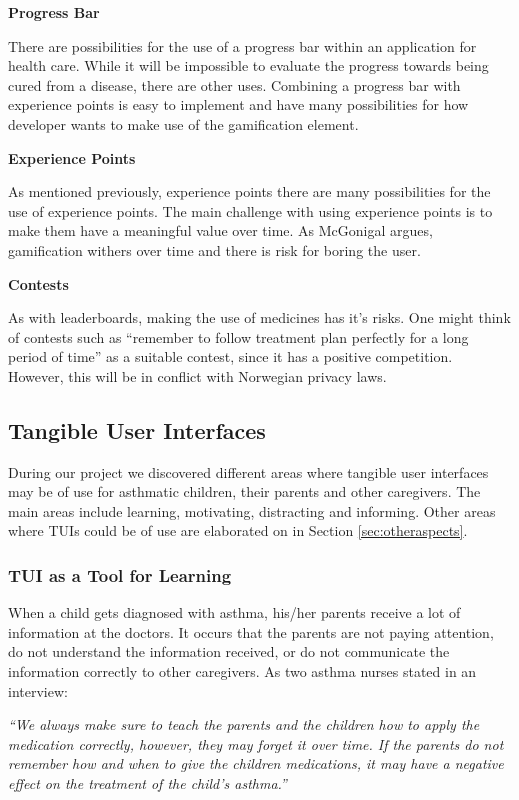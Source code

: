 \textbf{Progress Bar}

There are possibilities for the use of a progress bar within an application for health care. While it will be impossible to evaluate the progress towards being cured from a disease, there are other uses. Combining a progress bar with experience points is easy to implement and have many possibilities for how developer wants to make use of the gamification element. 

\textbf{Experience Points}

As mentioned previously, experience points there are many possibilities for the use of experience points. The main challenge with using experience points is to make them have a meaningful value over time. As McGonigal argues, gamification withers over time and there is risk for boring the user\cite{jane2011reality}.  

\textbf{Contests}

As with leaderboards, making the use of medicines has it's risks. One might think of contests such as ``remember to follow treatment plan perfectly for a long period of time'' as a suitable contest, since it has a positive competition. However, this will be in conflict with Norwegian privacy laws. 

\subsection{Tangible User Interfaces}
\label{sec:resultstui}
During our project we discovered different areas where tangible user interfaces may be of use for asthmatic children, their parents and other caregivers. The main areas include learning, motivating, distracting and informing. Other areas where TUIs could be of use are elaborated on in Section \ref{sec:otheraspects}.


\subsubsection{TUI as a Tool for Learning}
\label{sec:tuiasatoolforlearning}

When a child gets diagnosed with asthma, his/her parents receive a lot of information at the doctors. It occurs that the parents are not paying attention, do not understand the information received, or do not communicate the information correctly to other caregivers. As two asthma nurses stated in an interview: 

\textit{``We always make sure to teach the parents and the children how to apply the medication correctly, however, they may forget it over time. If the parents do not remember how and when to give the children medications, it may have a negative effect on the treatment of the child's asthma.''}

